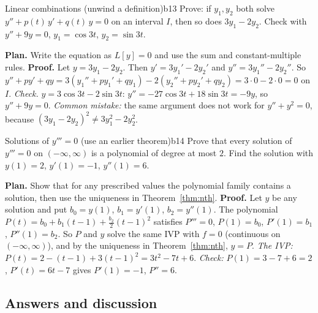 \documentclass[11pt]{article}
\begin{document}
\begin{exmp}{Linear combinations (unwind a definition)}{b13}
Prove: if $y_1,y_2$ both solve $y''+p(t)\,y'+q(t)\,y=0$ on an interval $I$, then so does $3y_1-2y_2$. Check with $y''+9y=0$, $y_1=\cos3t$, $y_2=\sin3t$.

\textbf{Plan.} Write the equation as $L[y]=0$ and use the sum and constant-multiple rules.
\textbf{Proof.} Let $y=3y_1-2y_2$. Then $y'=3y_1'-2y_2'$ and $y''=3y_1''-2y_2''$. So $y''+py'+qy=3\left(y_1''+py_1'+qy_1\right)-2\left(y_2''+py_2'+qy_2\right)=3\cdot0-2\cdot0=0$ on $I$.
\emph{Check.} $y=3\cos3t-2\sin3t$: $y''=-27\cos3t+18\sin3t=-9y$, so $y''+9y=0$. \emph{Common mistake:} the same argument does not work for $y''+y^2=0$, because $(3y_1-2y_2)^2\ne3y_1^2-2y_2^2$.
\end{exmp}

\begin{exmp}{Solutions of $y'''=0$ (use an earlier theorem)}{b14}
Prove that every solution of $y'''=0$ on $(-\infty,\infty)$ is a polynomial of degree at most $2$. Find the solution with $y(1)=2$, $y'(1)=-1$, $y''(1)=6$.

\textbf{Plan.} Show that for any prescribed values the polynomial family contains a solution, then use the uniqueness in Theorem~\ref{thm:nth}.
\textbf{Proof.} Let $y$ be any solution and put $b_0=y(1)$, $b_1=y'(1)$, $b_2=y''(1)$. The polynomial $P(t)=b_0+b_1(t-1)+\frac{b_2}2(t-1)^2$ satisfies $P'''=0$, $P(1)=b_0$, $P'(1)=b_1$, $P''(1)=b_2$. So $P$ and $y$ solve the same IVP with $f=0$ (continuous on $(-\infty,\infty)$), and by the uniqueness in Theorem~\ref{thm:nth}, $y=P$.
\emph{The IVP:} $P(t)=2-(t-1)+3(t-1)^2=3t^2-7t+6$. \emph{Check:} $P(1)=3-7+6=2$, $P'(t)=6t-7$ gives $P'(1)=-1$, $P''=6$.
\end{exmp}

\subsection*{Answers and discussion}
\end{document}
